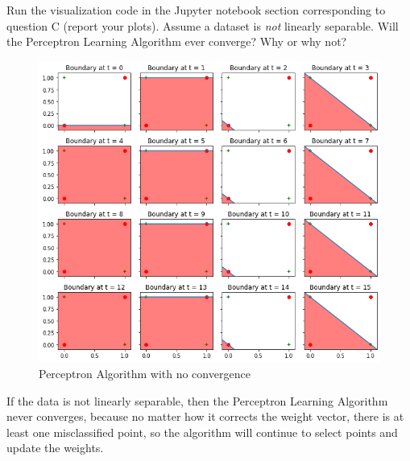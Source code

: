 \begin{problem}[2]
  Run the visualization code in the Jupyter notebook section corresponding to question C (report your plots). Assume a dataset is \emph{not} linearly separable. Will the Perceptron Learning Algorithm ever converge? Why or why not?
\end{problem}
\begin{solution}
  \begin{figure}[H]
    \centering
    \includegraphics[width=0.75\linewidth]{images/4c.png}
    \caption{Perceptron Algorithm with no convergence}
    \label{fig:4c}
  \end{figure}

  If the data is not linearly separable, then the Perceptron Learning Algorithm never converges, because no matter how it corrects the weight vector, there is at least one misclassified point, so the algorithm will continue to select points and update the weights.
\end{solution}
  
